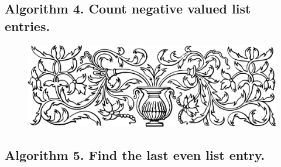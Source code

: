 \documentclass[preview]{standalone}
\begin{document}
\subsection[Count negative valued list entries.]{
    \color{section} Algorithm 4. \color{black} Count negative valued list entries.
}
\vspace{-1\baselineskip}

\vspace{1\baselineskip}
\begin{center}
    
\end{center}
\vspace{1\baselineskip}
\begin{center}
    
\end{center}
\pagebreak


\begin{figure}[!h]
    \centering
    \includegraphics[width=14cm]{../resources/jpg/3.1.algorithms/border1.png}
\end{figure}
\subsection[Find the last even list entry.]{
    \color{section} Algorithm 5. \color{black} Find the last even list entry.
}
\vspace{-1\baselineskip}

\vspace{1\baselineskip}
\begin{center}
    
\end{center}
\vspace{1\baselineskip}
\begin{center}
    
\end{center}
\pagebreak
\end{document}
